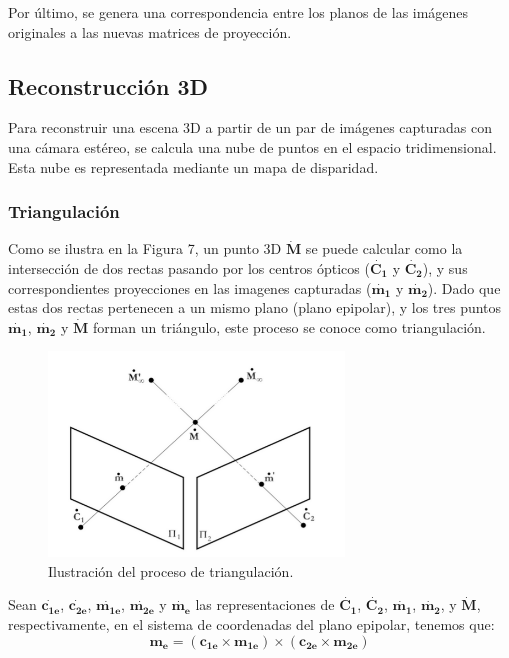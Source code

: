 \documentclass[11pt,a4paper,titlepage]{article}
\newcommand{\Two}[1]{\ensuremath{\mathbf{#1}}}
\newcommand{\TwoCart}[1]{\ensuremath{\mathbf{\dot{#1}}}}
\newcommand{\ThreeCart}[1]{\ensuremath{\mathbf{\dot{#1}}}}
\newcommand{\Figure}[1]{Figura #1}
\begin{document}
Por último, se genera una correspondencia entre los planos de las imágenes originales a las nuevas matrices de proyección.

\subsection{Reconstrucción 3D}

Para reconstruir una escena 3D a partir de un par de imágenes capturadas con una cámara estéreo, se calcula una nube de puntos en el espacio tridimensional. Esta nube es representada mediante un mapa de disparidad.

\subsubsection{Triangulación}

Como se ilustra en la \Figure{7}, un punto 3D \ThreeCart{M} se puede calcular como la intersección de dos rectas pasando por los centros ópticos (\ThreeCart{C_1} y \ThreeCart{C_2}), y sus correspondientes proyecciones en las imagenes capturadas (\TwoCart{m_1} y \TwoCart{m_2}). Dado que estas dos rectas pertenecen a un mismo plano (plano epipolar), y los tres puntos \TwoCart{m_1}, \TwoCart{m_2} y \ThreeCart{M} forman un triángulo, este proceso se conoce como triangulación.


\begin{figure}[h!]

  \centering
    \includegraphics[width=0.7\textwidth]{f7.png}
  \caption{Ilustración del proceso de triangulación.}
\end{figure}

Sean \TwoCart{c_{1e}}, \TwoCart{c_{2e}}, \TwoCart{m_{1e}}, \TwoCart{m_{2e}} y \TwoCart{m_e} las representaciones de  \ThreeCart{C_1}, \ThreeCart{C_2}, \TwoCart{m_1}, \TwoCart{m_2}, y \ThreeCart{M}, respectivamente, en el sistema de coordenadas del plano epipolar, tenemos que:
\[
	\Two{m_e} = (\Two{c_{1e}} \times \Two{m_{1e}}) \times (\Two{c_{2e}} \times \Two{m_{2e}})
\]
\end{document}
